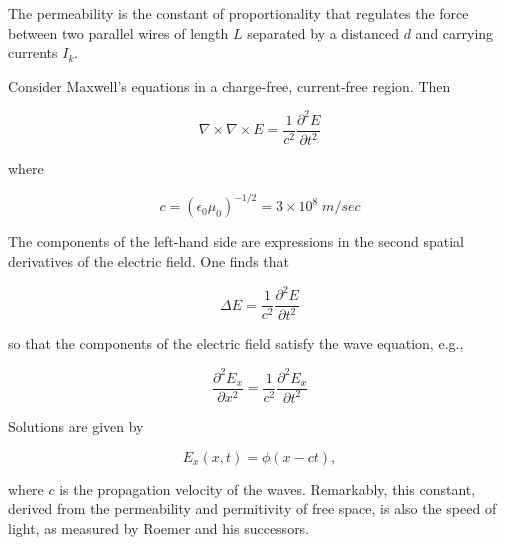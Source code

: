 The permeability is the constant of proportionality that
regulates the force between two parallel wires of length $L$
separated by a distanced $d$ and carrying currents $I_k$.

Consider
Maxwell's equations in a charge-free, current-free region.  Then

\begin{equation}
\nabla\times\nabla\times E =  \frac{1}{c^2} \frac{\partial^2 E}{\partial t^2}
\end{equation}

where

\begin{equation}
c = (\epsilon_0\mu_0)^{-1/2} = 3\times 10^8\; m/sec
\end{equation}

The components of the left-hand side are expressions in the
second spatial derivatives of the electric field.  One finds
that

\begin{equation}
\Delta E =  \frac{1}{c^2} \frac{\partial^2 E}{\partial t^2}
\end{equation}

so that the components of the electric field satisfy the wave
equation, e.g.,

\begin{equation}
 \frac{\partial^2 E_x}{\partial x^2}= \frac{1}{c^2} \frac{\partial^2 E_x}{\partial t^2}
\end{equation}

Solutions are given by

\begin{equation}
 E_x(x,t) = \phi(x - ct),
\end{equation}

where $c$ is the propagation velocity of the waves.  Remarkably,
this constant, derived from the permeability and permitivity
of free space, is also the speed of light, as measured by Roemer
and his successors.


